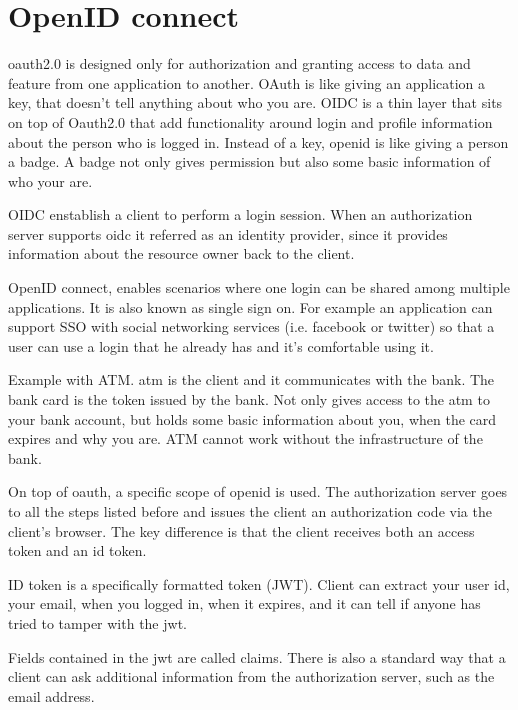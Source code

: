 \documentclass[20pt]{style}
\begin{document}
\section{OpenID connect}

oauth2.0 is designed only for authorization and granting access to data and
feature from one application to another.
OAuth is like giving an application a key, that doesn't tell anything about who
you are.
OIDC is a thin layer that sits on top of Oauth2.0 that add functionality around
login and profile information about the person who is logged in.
Instead of a key, openid is like giving a person a badge. A badge not only gives
permission but also some basic information of who your are.

OIDC enstablish a client to perform a login session.
When an authorization server supports oidc it referred as an identity provider,
since it provides information about the resource owner back to the client.

OpenID connect, enables scenarios where one login can be shared among multiple
applications. It is also known as single sign on.
For example an application can support SSO with social networking services (i.e.
facebook or twitter) so that a user can use a login that he already has and it's
comfortable using it.

Example with ATM. atm is the client and it communicates with the bank. The bank
card is the token issued by the bank. Not only gives access to the atm to your
bank account, but holds some basic information about you, when the card expires
and why you are.
ATM cannot work without the infrastructure of the bank.

On top of oauth, a specific scope of openid is used. The authorization server
goes to all the steps listed before and issues the client an authorization code
via the client's browser.
The key difference is that the client receives both an access token and an id
token.

ID token is a specifically formatted token (JWT). Client can extract your user
id, your email, when you logged in, when it expires, and it can tell if anyone
has tried to tamper with the jwt.

Fields contained in the jwt are called claims.
There is also a standard way that a client can ask additional information from the
authorization server, such as the email address.

\end{document}
